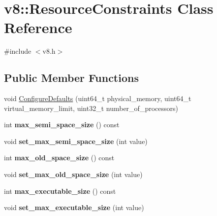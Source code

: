 \hypertarget{classv8_1_1_resource_constraints}{}\section{v8\+:\+:Resource\+Constraints Class Reference}
\label{classv8_1_1_resource_constraints}


{\ttfamily \#include $<$v8.\+h$>$}

\subsection*{Public Member Functions}
\begin{DoxyCompactItemize}
\item 
void \hyperlink{classv8_1_1_resource_constraints_a6e5d38fd99d89d4fc10e325507d08d52}{Configure\+Defaults} (uint64\+\_\+t physical\+\_\+memory, uint64\+\_\+t virtual\+\_\+memory\+\_\+limit, uint32\+\_\+t number\+\_\+of\+\_\+processors)
\item 
\hypertarget{classv8_1_1_resource_constraints_aeeecbbdb2c7880bf74d5d7fb9bbc52b3}{}int {\bfseries max\+\_\+semi\+\_\+space\+\_\+size} () const \label{classv8_1_1_resource_constraints_aeeecbbdb2c7880bf74d5d7fb9bbc52b3}

\item 
\hypertarget{classv8_1_1_resource_constraints_ac83efbf72458c872009f66019352409e}{}void {\bfseries set\+\_\+max\+\_\+semi\+\_\+space\+\_\+size} (int value)\label{classv8_1_1_resource_constraints_ac83efbf72458c872009f66019352409e}

\item 
\hypertarget{classv8_1_1_resource_constraints_a72840efdbcfc7bb287c6aea38d0b07b9}{}int {\bfseries max\+\_\+old\+\_\+space\+\_\+size} () const \label{classv8_1_1_resource_constraints_a72840efdbcfc7bb287c6aea38d0b07b9}

\item 
\hypertarget{classv8_1_1_resource_constraints_aa764be7c76b4baa3fce7a54c3777b5e9}{}void {\bfseries set\+\_\+max\+\_\+old\+\_\+space\+\_\+size} (int value)\label{classv8_1_1_resource_constraints_aa764be7c76b4baa3fce7a54c3777b5e9}

\item 
\hypertarget{classv8_1_1_resource_constraints_a037777e608ed1c22fe294ecef5722036}{}int {\bfseries max\+\_\+executable\+\_\+size} () const \label{classv8_1_1_resource_constraints_a037777e608ed1c22fe294ecef5722036}

\item 
\hypertarget{classv8_1_1_resource_constraints_a37d1b38672e9844c567823a119dcd557}{}void {\bfseries set\+\_\+max\+\_\+executable\+\_\+size} (int value)\label{classv8_1_1_resource_constraints_a37d1b38672e9844c567823a119dcd557}


\end{DoxyCompactItemize}
